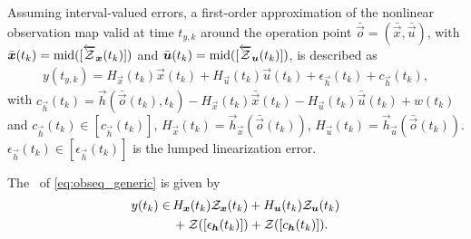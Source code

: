 \documentclass{ifacconf}
\begin{document}
Assuming interval-valued errors, a first-order approximation 
of the nonlinear observation map valid at time $t_{y,k}$ 
around the operation point ${\bar{\vec{o}}=(\bar{\vec{x}},\bar{\vec{u}})}$, with
${\bar{\boldsymbol{x}} (t_{k}) = \operatorname{mid}([\overleftarrow{\mathcal{Z}}_{\boldsymbol{x}} (t_{k})])}$
 and
${\bar{\boldsymbol{u}} (t_{k}) = \operatorname{mid}([\overleftarrow{\mathcal{Z}}_{\boldsymbol{u}} (t_{k})])}$,
is described as
\begin{align}
  {y}(t_{y,k})  = 
      H_{\vec{x}}(t_k)
      \vec{x}(t_k)
      +
      H_{\vec{u}}(t_k)
      {\vec{u}}(t_k) + \epsilon_{\vec{h}} (t_k)
      + c_{\vec{h}} (t_k),
      \label{eq:obseq_generic}
\end{align}
with
${c_{\vec{h}}(t_k) =
               \vec{h}(\bar{\vec{o}}(t_k),t_{k})
                         -
                           H_{\vec{x}}(t_k)
                           \bar{\vec{x}}(t_k)
                           -
                           H_{\vec{u}}(t_k)
                           \bar{\vec{u}}(t_k) + w (t_k)}$ and $c_{\vec{h}} (t_k)\in [c_{\vec{h}} (t_k)]$,
${H_{\vec{x}}(t_k) =  \vec{h}_{\vec{x}}(\bar{\vec{o}}(t_{k}))}$,
${H_{\vec{u}}(t_k) =  \vec{h}_{\vec{u}}(\bar{\vec{o}}(t_{k}))}$.
${\epsilon_{\vec{h}}(t_k) \in [\epsilon_{\vec{h}}(t_k)]}$ is the lumped linearization error.


The \linearinclusion\ of \eqref{eq:obseq_generic} is given by
\begin{align}
  {y}(t_k) \in\, &
                       H_{\boldsymbol{x}}(t_k)
                       \mathcal{Z}_{\boldsymbol{x}} (t_k)
                       + H_{\boldsymbol{u}}(t_k)
                       \mathcal{Z}_{\boldsymbol{u}} (t_k) \nonumber \\
                     &
                       + \mathcal{Z}([\epsilon_{\boldsymbol{h}} (t_k)])
                       + \mathcal{Z}([c_{\boldsymbol{h}} (t_k)]).
                       \label{eq:obseqinclusion_generic}
\end{align}
\end{document}
